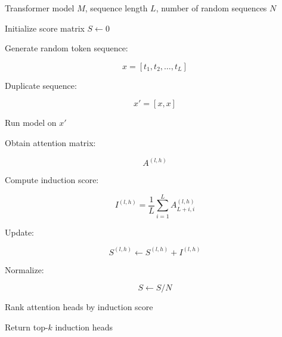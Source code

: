\documentclass[twocolumn]{article}
\begin{document}
\begin{algorithm}[t]

\scriptsize

\setlength{\abovedisplayskip}{3pt}
\setlength{\belowdisplayskip}{3pt}

\caption{Identification of Top Induction Heads}

\label{alg:induction_head_identification}

\begin{algorithmic}[1]

\Require Transformer model $M$, sequence length $L$, number of random sequences $N$

\State Initialize score matrix $S \leftarrow 0$


\State Generate random token sequence:

\[
x=[t_1,t_2,\dots,t_L]
\]

\State Duplicate sequence:

\[
x'=[x,x]
\]

\State Run model on $x'$


\State Obtain attention matrix:

\[
A^{(l,h)}
\]

\State Compute induction score:

\[
I^{(l,h)}
=
\frac{1}{L}
\sum_{i=1}^{L}
A^{(l,h)}_{L+i,i}
\]

\State Update:

\[
S^{(l,h)}
\leftarrow
S^{(l,h)}
+
I^{(l,h)}
\]

\EndFor

\EndFor

\State Normalize:

\[
S\leftarrow S/N
\]

\State Rank attention heads by induction score

\State Return top-$k$ induction heads

\end{algorithmic}

\end{algorithm}
\end{document}
